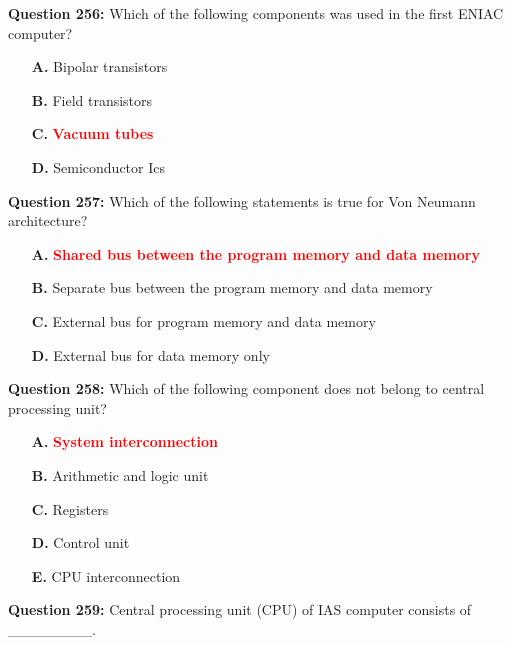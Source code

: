 \documentclass[12pt,a4paper]{article}
\begin{document}
\vspace{0.5cm}

\textbf{Question 256:} Which of the following components was used in the first ENIAC computer?

\begin{itemize}
    \item[\textbf{A.}] Bipolar transistors
    \item[\textbf{B.}] Field transistors
    \item[\textbf{C.}] \textcolor{red}{\textbf{Vacuum tubes}}
    \item[\textbf{D.}] Semiconductor Ics
\end{itemize}

\vspace{0.5cm}

\textbf{Question 257:} Which of the following statements is true for Von Neumann architecture?

\begin{itemize}
    \item[\textbf{A.}] \textcolor{red}{\textbf{Shared bus between the program memory and data memory}}
    \item[\textbf{B.}] Separate bus between the program memory and data memory
    \item[\textbf{C.}] External bus for program memory and data memory
    \item[\textbf{D.}] External bus for data memory only
\end{itemize}

\vspace{0.5cm}

\textbf{Question 258:} Which of the following component does not belong to central processing unit?

\begin{itemize}
    \item[\textbf{A.}] \textcolor{red}{\textbf{System interconnection}}
    \item[\textbf{B.}] Arithmetic and logic unit
    \item[\textbf{C.}] Registers
    \item[\textbf{D.}] Control unit
    \item[\textbf{E.}] CPU interconnection
\end{itemize}

\vspace{0.5cm}

\textbf{Question 259:} Central processing unit (CPU) of IAS computer consists of ________.
\end{document}
